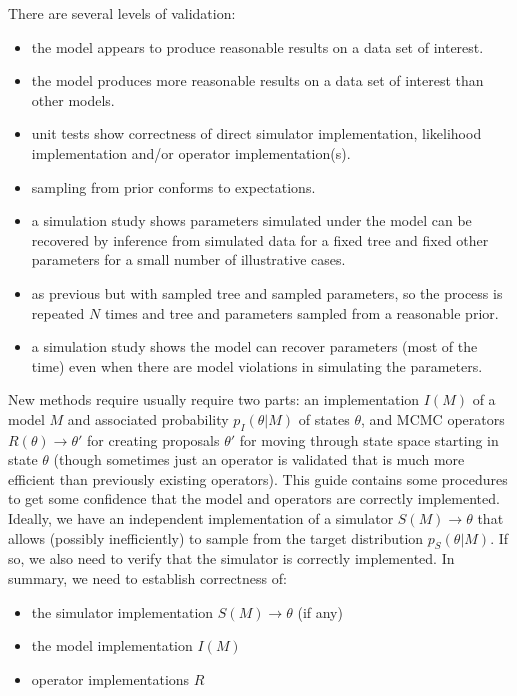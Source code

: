 \documentclass[oneside]{article}
\begin{document}
There are several levels of validation:

\begin{itemize}
\item the model appears to produce reasonable results on a data set of interest.
\item the model produces more reasonable results on a data set of interest than other models.
\item unit tests show correctness of direct simulator implementation, likelihood implementation and/or  
operator implementation(s).
\item sampling from prior conforms to expectations.
\item a simulation study shows parameters simulated under the model can be recovered by inference 
from simulated data for a fixed tree and fixed other parameters for a small number of illustrative cases.
\item as previous but with sampled tree and sampled parameters, so the process is repeated $N$ times 
and tree and parameters sampled from a reasonable prior.
\item a simulation study shows the model can recover parameters (most of the time) even when there 
are model violations in simulating the parameters.
\end{itemize}

	
New methods require usually require two parts: an implementation
\(I(M)\) of a model \(M\) and associated probability \(p_I(\theta|M)\)
of states \(\theta\), and MCMC operators \(R(\theta)\to\theta'\) for
creating proposals \(\theta'\) for moving through state space starting
in state \(\theta\) (though sometimes just an operator is validated that
is much more efficient than previously existing operators). This guide
contains some procedures to get some confidence that the model and
operators are correctly implemented. Ideally, we have an independent
implementation of a simulator \(S(M)\to\theta\) that allows (possibly
inefficiently) to sample from the target distribution \(p_S(\theta|M)\).
If so, we also need to verify that the simulator is correctly
implemented. In summary, we need to establish correctness of:

\begin{itemize}
\item
  the simulator implementation \(S(M)\to\theta\) (if any)
\item
  the model implementation \(I(M)\)
\item
  operator implementations \(R\)
\end{itemize}
\end{document}
